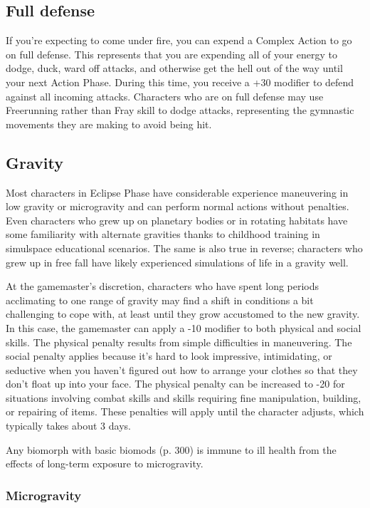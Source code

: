 \subsection{Full defense}
\label{sec:full-defense}

If you’re expecting to come under fire, you can expend a Complex Action to go on full defense. This represents that you are expending all of your energy to dodge, duck, ward off attacks, and otherwise get the hell out of the way until your next Action Phase. During this time, you receive a +30 modifier to defend against all incoming attacks. Characters who are on full defense may use Freerunning rather than Fray skill to dodge attacks, representing the gymnastic movements they are making to avoid being hit.

\subsection{Gravity}
\label{sec:gravity}

Most characters in Eclipse Phase have considerable experience maneuvering in low gravity or microgravity and can perform normal actions without penalties. Even characters who grew up on planetary bodies or in rotating habitats have some familiarity with alternate gravities thanks to childhood training in simulspace educational scenarios. The same is also true in reverse; characters who grew up in free fall have likely experienced simulations of life in a gravity well.

At the gamemaster’s discretion, characters who have spent long periods acclimating to one range of gravity may find a shift in conditions a bit challenging to cope with, at least until they grow accustomed to the new gravity. In this case, the gamemaster can apply a -10 modifier to both physical and social skills. The physical penalty results from simple difficulties in maneuvering. The social penalty applies because it’s hard to look impressive, intimidating, or seductive when you haven’t figured out how to arrange your clothes so that they don’t float up into your face. The physical penalty can be increased to -20 for situations involving combat skills and skills requiring fine manipulation, building, or repairing of items. These penalties will apply until the character adjusts, which typically takes about 3 days.

Any biomorph with basic biomods (p. 300) is immune to ill health from the effects of long-term exposure to microgravity.

\subsubsection{Microgravity}

